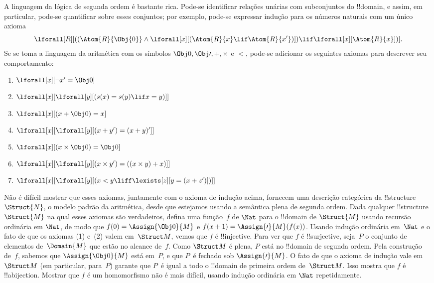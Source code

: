 \documentclass[../../../include/open-logic-section]{subfiles}
\begin{document}
A linguagem da lógica de segunda ordem é bastante rica. Pode-se identificar
relações unárias com subconjuntos do !!{domain}, e assim, em particular, pode-se
quantificar sobre esses conjuntos; por exemplo, pode-se expressar indução
para os números naturais com um único axioma
\[
\lforall[R][((\Atom{R}{\Obj{0}} \land \lforall[x][(\Atom{R}{x} \lif
    \Atom{R}{x'})]) \lif \lforall[x][\Atom{R}{x}])].
\]
Se se toma a linguagem da aritmética com os símbolos $\Obj 0, \Obj \prime, +,
\times$ e $<$, pode-se adicionar os seguintes axiomas para descrever seu
comportamento:
\begin{enumerate}
\item $\lforall[x][\lnot x' = \Obj 0]$
\item $\lforall[x][\lforall[y][(s(x) = s(y) \lif x = y)]]$
\item $\lforall[x][(x + \Obj 0) = x]$
\item $\lforall[x][\lforall[y][(x + y') = (x + y)']]$
\item $\lforall[x][(x \times \Obj 0) = \Obj 0]$
\item $\lforall[x][\lforall[y][(x \times y') = ((x \times y) + x)]]$
\item $\lforall[x][\lforall[y][(x < y \liff \lexists[z][y = (x + z')])]]$
\end{enumerate}
Não é difícil mostrar que esses axiomas, juntamente com o axioma
de indução acima, fornecem uma descrição categórica da
!!{structure}~$\Struct{N}$, o modelo padrão da aritmética, desde que
estejamos usando a semântica plena de segunda ordem. Dada qualquer
!!{structure}~$\Struct{M}$ na qual esses axiomas são verdadeiros, defina uma
função~$f$ de $\Nat$ para o !!{domain} de $\Struct{M}$ usando
recursão ordinária em $\Nat$, de modo que $f(0) = \Assign{\Obj 0}{M}$ e
$f(x+1) = \Assign{\prime}{M}(f(x))$. Usando indução ordinária
em~$\Nat$ e o fato de que os axiomas (1) e~(2) valem em~$\Struct M$, vemos
que $f$ é !!{injective}. Para ver que $f$ é !!{surjective},
seja~$P$ o conjunto de elementos de~$\Domain{M}$ que estão no alcance
de~$f$. Como $\Struct M$ é plena, $P$ está no !!{domain} de segunda ordem.
Pela construção de~$f$, sabemos que $\Assign{\Obj
  0}{M}$ está em~$P$, e que $P$~é fechado sob
$\Assign{\prime}{M}$. O fato de que o axioma de indução vale em
$\Struct M$ (em particular, para~$P$) garante que $P$~é igual a
todo o !!{domain} de primeira ordem de~$\Struct M$. Isso mostra que $f$
é !!a{bijection}. Mostrar que $f$ é um homomorfismo não é mais
difícil, usando indução ordinária em $\Nat$ repetidamente.
\end{document}
